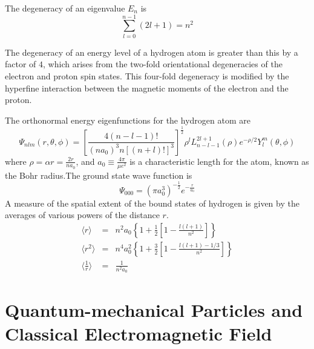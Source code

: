 \documentclass[cyan]{elegantnote}
\begin{document}
The degeneracy of an eigenvalue $E_n$ is
\[\sum_{l=0}^{n-1} (2l+1) = n^2\]
\begin{note}
The degeneracy of an energy level of a hydrogen atom is greater than this by a factor of $4$, which arises from the two-fold orientational degeneracies of the electron and proton spin states. This four-fold degeneracy is modified by the hyperfine interaction between the magnetic moments of the electron and the proton.
\end{note}
The orthonormal energy eigenfunctions for the hydrogen atom are
\[\Psi_{nlm}(r,\theta,\phi) =  \left[ \frac{4(n-l-1)!}{(na_0)^3 n[(n+l)!]^3} \right]^{\frac{1}{2}} \rho^l L_{n-l-1}^{2l+1}(\rho) e^{-\rho/2} Y_l^m (\theta,\phi)\]
where $\rho = \alpha r = \frac{2r}{na_0}$, and $a_0 \equiv \frac{4\pi}{\mu e^2}$ is a characteristic length for the
atom, known as the Bohr radius.The ground state wave
function is
\[\Psi_{000} = (\pi a_0^3)^{-\frac{1}{2}} e^{-\frac{r}{a_0}}\]
A measure of the spatial extent of the bound states of hydrogen is given by the averages of various powers of the distance $r$.
\begin{eqnarray}
\langle r \rangle &=& n^2a_0 \left \{ 1 + \frac{1}{2} \left [ 1 - \frac{l(l+1)}{n^2} \right] \right\} \nonumber \\
\langle r^2 \rangle &=& n^4a_0^2 \left \{ 1 + \frac{3}{2} \left [ 1 - \frac{l(l+1)-1/3}{n^2} \right] \right\} \nonumber \\
\langle \frac{1}{r} \rangle &=& \frac{1}{n^2 a_0} \nonumber
\end{eqnarray}

\chapter{Quantum-mechanical Particles and Classical Electromagnetic Field}
\end{document}
